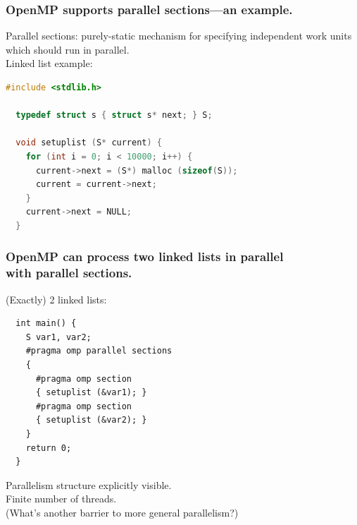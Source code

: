 \begin{frame}[fragile]
  \frametitle{OpenMP supports parallel sections---an example.}

\large
  
  \begin{changemargin}{.5cm}
  Parallel sections: purely-static mechanism for specifying independent work units which should run in
  parallel.\\[1em]

  Linked list example:

{\small
\begin{lstlisting}[language=C,morekeywords={foreach,pragma,omp,parallel,single,nowait,task,untied,barrier,taskyield}]
  #include <stdlib.h>

  typedef struct s { struct s* next; } S;

  void setuplist (S* current) {
    for (int i = 0; i < 10000; i++) {
      current->next = (S*) malloc (sizeof(S));
      current = current->next;
    }
    current->next = NULL;
  }
  \end{lstlisting}
}

  \end{changemargin}


\end{frame}

\begin{frame}[fragile]
  \frametitle{OpenMP can process two linked lists in parallel \\ with parallel sections.}
  
  \begin{changemargin}{1cm}

  (Exactly) 2 linked lists:
{\small
  \begin{lstlisting}
  int main() {
    S var1, var2;
    #pragma omp parallel sections
    {
      #pragma omp section
      { setuplist (&var1); }
      #pragma omp section
      { setuplist (&var2); }
    }
    return 0;
  }
\end{lstlisting}}

  Parallelism structure explicitly visible.\\[1em]
  Finite number of threads.\\[1em]
  (What's another barrier to more general parallelism?)

  \end{changemargin}


\end{frame}


